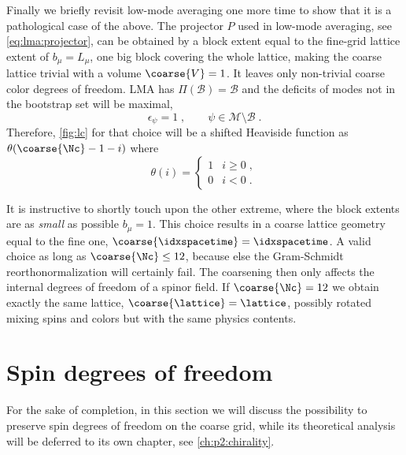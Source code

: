 Finally we briefly revisit low-mode averaging one more time to show that it is a pathological case of the above.
The projector $P$ used in low-mode averaging, see \cref{eq:lma:projector}, can be obtained by a block extent equal to the fine-grid lattice extent of $b_{\mu} = L_{\mu}$, \ie one big block covering the whole lattice, making the coarse lattice trivial with a volume $\coarse{V} = 1$.
It leaves only non-trivial coarse color degrees of freedom.
LMA has $\Pi(\mathcal{B}) = \mathcal{B}$ and the deficits of modes not in the bootstrap set will be maximal,
\begin{equation}
\epsilon_\psi = 1 \;,
\qquad
\psi \in \mathcal{M} \setminus \mathcal{B} \;.
\end{equation}
Therefore, \cref{fig:lc} for that choice will be a shifted Heaviside function as $\theta(\coarse{\Nc} -1 - i)$ where
\begin{equation}
\theta(i) = \begin{cases}
1 & i \geq 0 \;,  \\
0 & i < 0 \;.
\end{cases}
\end{equation}

It is instructive to shortly touch upon the other extreme, where the block extents are as \emph{small} as possible $b_{\mu} = 1$.
This choice results in a coarse lattice geometry equal to the fine one, $\coarse{\idxspacetime} = \idxspacetime$.
A valid choice as long as $\coarse{\Nc} \leq 12$, because else the Gram-Schmidt reorthonormalization will certainly fail.
The coarsening then only affects the internal degrees of freedom of a spinor field.
If $\coarse{\Nc} = 12$ we obtain exactly the same lattice, $\coarse{\lattice} = \lattice$, possibly rotated mixing spins and colors but with the same physics contents.



\section{Spin degrees of freedom}

\label{sec:lc:spin}

For the sake of completion, in this section we will discuss the possibility to preserve spin degrees of freedom on the coarse grid, while its theoretical analysis will be deferred to its own chapter, see \cref{ch:p2:chirality}.

